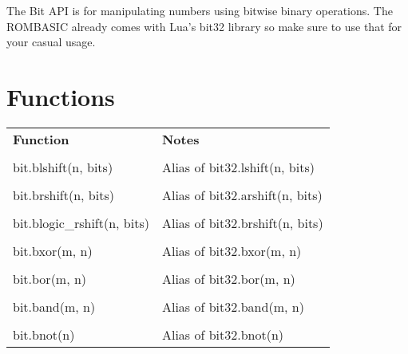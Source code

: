 The Bit API is for manipulating numbers using bitwise binary operations. The ROMBASIC already comes with Lua's bit32 library so make sure to use that for your casual usage.

\section{Functions}

\begin{tabularx}{\textwidth}{l X}
	\textbf{\large Function} & \textbf{\large Notes}
	\\ \\
	\endhead
	bit.blshift(n, bits) & Alias of bit32.lshift(n, bits)
	\\ \\
	bit.brshift(n, bits) & Alias of bit32.arshift(n, bits)
	\\ \\
	bit.blogic\_rshift(n, bits) & Alias of bit32.brshift(n, bits)
	\\ \\
	bit.bxor(m, n) & Alias of bit32.bxor(m, n)
	\\ \\
	bit.bor(m, n) & Alias of bit32.bor(m, n)
	\\ \\
	bit.band(m, n) & Alias of bit32.band(m, n)
	\\ \\
	bit.bnot(n) & Alias of bit32.bnot(n)
\end{tabularx}